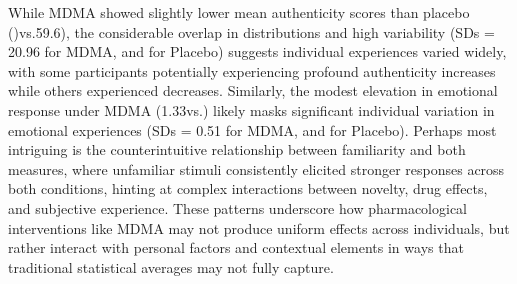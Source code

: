 \documentclass[
  man,
  longtable,
  nolmodern,
  notxfonts,
  notimes,
  colorlinks=true,linkcolor=blue,citecolor=blue,urlcolor=blue]{apa7}
\begin{document}
While MDMA showed slightly lower mean authenticity scores than placebo
()vs.59.6), the considerable overlap in distributions and high
variability (SDs = 20.96 for MDMA, and for Placebo) suggests individual
experiences varied widely, with some participants potentially
experiencing profound authenticity increases while others experienced
decreases. Similarly, the modest elevation in emotional response under
MDMA (1.33vs.) likely masks significant individual variation in
emotional experiences (SDs = 0.51 for MDMA, and for Placebo). Perhaps
most intriguing is the counterintuitive relationship between familiarity
and both measures, where unfamiliar stimuli consistently elicited
stronger responses across both conditions, hinting at complex
interactions between novelty, drug effects, and subjective experience.
These patterns underscore how pharmacological interventions like MDMA
may not produce uniform effects across individuals, but rather interact
with personal factors and contextual elements in ways that traditional
statistical averages may not fully capture.
\end{document}
